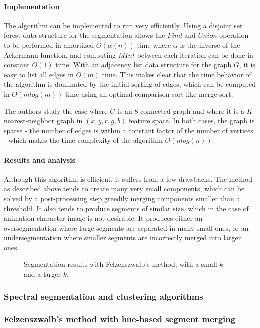 \paragraph{Implementation} The algorithm can be implemented to run very efficiently. Using a disjoint set forest data structure for the segmentation allows the $Find$ and $Union$ operation to be performed in amortized $O(\alpha(n))$ time where $\alpha$ is the inverse of the Ackermann function, and computing $MInt$ between each iteration can be done in constant $O(1)$ time. With an adjacency list data structure for the graph $G$, it is easy to list all edges in $O(m)$ time. This makes clear that the time behavior of the algorithm is dominated by the initial sorting of edges, which can be computed in $O(mlog(m))$ time using an optimal comparison sort like merge sort.

The authors study the case where $G$ is an $8$-connected graph and where it is a $K$-nearest-neighbor graph in $(x, y, r, g, b)$ feature space. In both cases, the graph is sparse - the number of edges is within a constant factor of the number of vertices - which makes the time complexity of the algorithm $O(nlog(n))$.


\paragraph{Results and analysis} Although this algorithm is efficient, it suffers from a few drawbacks. The method as described above tends to create many very small components, which can be solved by a post-processing step greedily merging components smaller than a threshold. It also tends to produce segments of similar size, which in the case of animation character image is not desirable. It produces either an oversegmentation where large segments are separated in many small ones, or an undersegmentation where smaller segments are incorrectly merged into larger ones.

\begin{figure}[htb!]
\caption{Segmentation results with Felzenszwalb's method, with a small $k$ and a larger $k$.}
\label{fig:felzenszwalbSegmentationResults}
\end{figure}

\subsubsection{Spectral segmentation and clustering algorithms}

\subsubsection{Felzenszwalb's method with hue-based segment merging}
